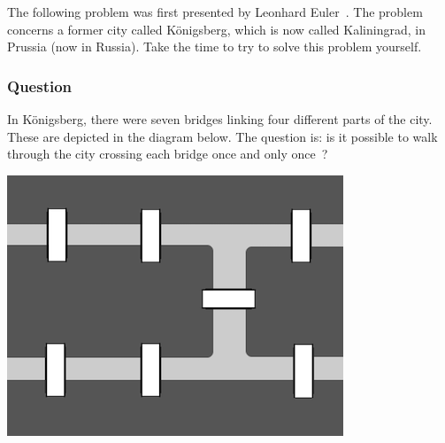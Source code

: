 

\noindent
The following problem was first presented by Leonhard Euler~\cite{euleroriginal}.
The problem concerns a former city called Königsberg, which is now called Kaliningrad, in Prussia (now in Russia).
Take the time to try to solve this problem yourself.

\subsubsection*{Question}
In Königsberg, there were seven bridges linking four different parts of the city.
These are depicted in the diagram below.
The question is: is it possible to walk through the city crossing each bridge once and only once~\cite{konigsbergwikipedia}?

\begin{center}
\includegraphics{diagram}
\end{center}